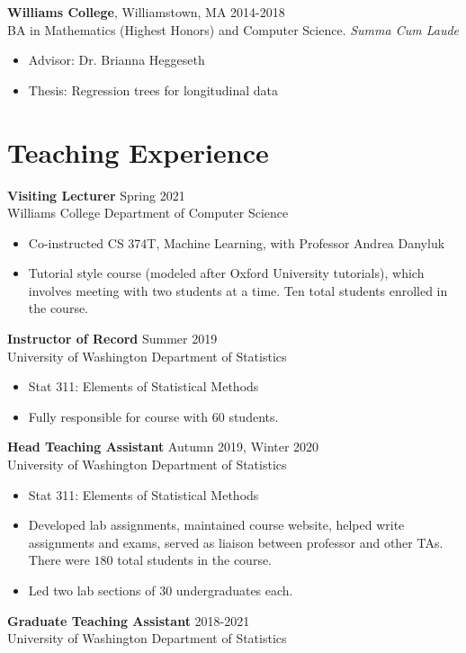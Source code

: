 \documentclass[margin, 10pt]{res}
\begin{document}
\begin{resume}
{\textbf{Williams College}}, Williamstown, MA \hfill 2014-2018  \\
BA in Mathematics (Highest Honors) and Computer Science. \textit{Summa Cum Laude} 
\begin{itemize}
\item Advisor: Dr. Brianna Heggeseth
\item Thesis: Regression trees for longitudinal data 
\end{itemize}
 
\section{Teaching Experience}
{\textbf{Visiting Lecturer}} \hfill Spring 2021 \\
Williams College Department of Computer Science
\begin{itemize}
\item Co-instructed CS 374T, Machine Learning, with Professor Andrea Danyluk
\item Tutorial style course (modeled after Oxford University tutorials), which involves meeting with two students at a time. Ten total students enrolled in the course. 
\end{itemize}
{\textbf{Instructor of Record}} \hfill Summer 2019 \\
University of Washington Department of Statistics
\begin{itemize}
\item Stat 311: Elements of Statistical Methods
\item Fully responsible for course with $60$ students.
\end{itemize}
{\textbf{Head Teaching Assistant}} \hfill Autumn 2019, Winter 2020 \\
University of Washington Department of Statistics
\begin{itemize}
\item Stat 311: Elements of Statistical Methods
\item Developed lab assignments, maintained course website, helped write assignments and exams, served as liaison between professor and other TAs. There were $180$ total students in the course. 
\item Led two lab sections of 30 undergraduates each. 
\end{itemize} 
{\textbf{Graduate Teaching Assistant}} \hfill 2018-2021 \\
University of Washington Department of Statistics
\begin{itemize}

\end{itemize}
\end{resume}
\end{document}
